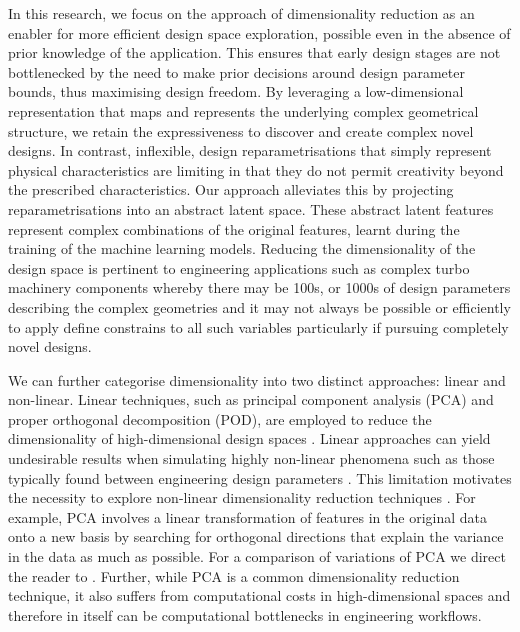 \documentclass{article}
\begin{document}
In this research, we focus on the approach of dimensionality reduction as an enabler for more efficient design space exploration, possible even in the absence of prior knowledge of the application. This ensures that early design stages are not bottlenecked by the need to make prior decisions around design parameter bounds, thus maximising design freedom. By leveraging a low-dimensional representation that maps and represents the underlying complex geometrical structure, we retain the expressiveness to discover and create complex novel designs. In contrast, inflexible, design reparametrisations that simply represent physical characteristics are limiting in that they do not permit creativity beyond the prescribed characteristics. Our approach alleviates this by projecting reparametrisations into an abstract latent space. These abstract latent features represent complex combinations of the original features, learnt during the training of the machine learning models.  Reducing the dimensionality of the design space is pertinent to engineering applications such as complex turbo machinery components whereby there may be 100s, or 1000s of design parameters describing the complex geometries and it may not always be possible or efficiently to apply define constrains to all such variables particularly if pursuing completely novel designs.

We can further categorise dimensionality into two distinct approaches: linear and non-linear. Linear techniques, such as principal component analysis (PCA) and proper orthogonal decomposition (POD), are employed to reduce the dimensionality of high-dimensional design spaces \citep{Diez2024}. Linear approaches can yield undesirable results when simulating highly non-linear phenomena such as those typically found between engineering design parameters \citep{Deshpande2024}. This limitation motivates the necessity to explore non-linear dimensionality reduction techniques \citep{Diez2024}. For example, PCA involves a linear transformation of features in the original data onto a new basis \citep{Donnelly2024} by searching for orthogonal directions that explain the variance in the data as much as possible. For a comparison of variations of PCA we direct the reader to \cite{Sorzano2014}. Further, while PCA is a common dimensionality reduction technique, it also suffers from computational costs in high-dimensional spaces \citep{Donnelly2024} and therefore in itself can be computational bottlenecks in engineering workflows.
\end{document}
